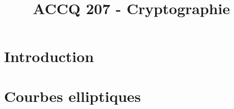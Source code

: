 \documentclass[a4paper,9pt]{article}
\title{\vspace{-1.2cm} \textbf{ACCQ 207 - Cryptographie}}
\begin{document}
\maketitle

\vspace{-1.5cm}

\section{Introduction}
	

\section{Courbes elliptiques}
	
\end{document}
